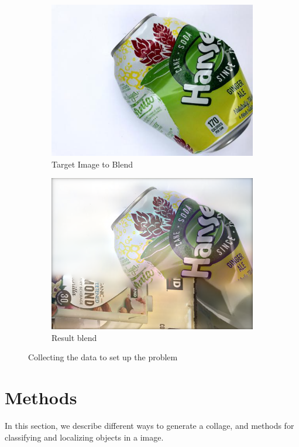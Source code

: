 \documentclass{article}
\begin{document}
\begin{figure}
\begin{subfigure}[b]{0.2\linewidth}
    \includegraphics[width=\linewidth]{data/images/04_GP_GAN/metal14.jpg}
    \caption{Target Image to Blend}
  \end{subfigure}
  \begin{subfigure}[b]{0.2\linewidth}
    \includegraphics[width=\linewidth]{data/images/04_GP_GAN/result-cardboard331-metal14.png}
    \caption{Result blend}
  \end{subfigure}
  \caption{Collecting the data to set up the problem}
  \label{fig:GAN_Blending}
\end{figure}



\section{ Methods }
In this section, we describe different ways to generate a collage, and methods for classifying and localizing objects in a image. 
\end{document}
